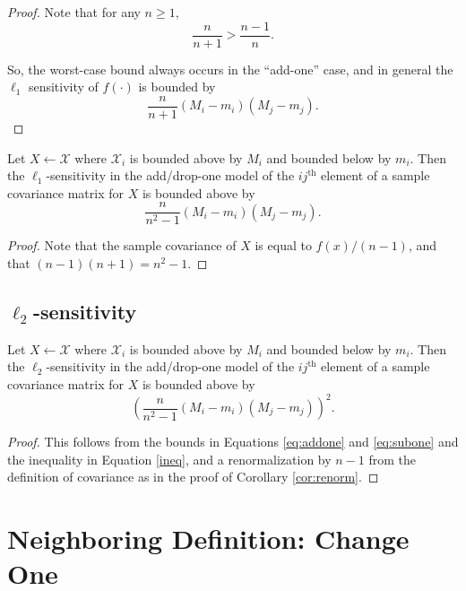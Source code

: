 \documentclass[11pt]{scrartcl} %
\begin{document}
\begin{proof}
Note that for any $n \ge 1$,
	\begin{equation}
	\label{ineq}
	 \frac{n}{n + 1} > \frac{n-1}{n}.
	\end{equation}

So, the worst-case bound always occurs in the ``add-one'' case, and in general the  $\ell_1$ sensitivity of $f(\cdot)$ is bounded by
 $$ \frac{n}{n+1}  (M_i - m_i)(M_j - m_j).$$ 
\end{proof}

\begin{corollary}
\label{cor:renorm}
Let $X \leftarrow \mathcal{X}$ where $\mathcal{X}_i$ is bounded above by $M_i$ and bounded below by $m_i$. Then the $\ell_1$-sensitivity in the add/drop-one model of the $ij^{\text{th}}$ element of a sample covariance matrix for $X$ is bounded above by 
$$ \frac{n}{n^2-1}(M_i - m_i)(M_j - m_j).$$
\end{corollary}

\begin{proof}
Note that the sample covariance of $X$ is equal to $f(x)/(n-1)$, and that $(n-1)(n+1) = n^2 -1$.
\end{proof}

\subsection{$\ell_2$-sensitivity}

\begin{theorem}
Let $X \leftarrow \mathcal{X}$ where $\mathcal{X}_i$ is bounded above by $M_i$ and bounded below by $m_i$. Then the $\ell_2$-sensitivity in the add/drop-one model of the $ij^{\text{th}}$ element of a sample covariance matrix for $X$ is bounded above by
$$\left(\frac{n}{n^2-1}(M_i - m_i)(M_j - m_j)\right)^2.$$
\end{theorem}

\begin{proof}
This follows from the bounds in Equations \ref{eq:addone} and \ref{eq:subone} and the inequality in Equation \ref{ineq}, and a renormalization by $n-1$ from the definition of covariance as in the proof of Corollary \ref{cor:renorm}.
\end{proof}

\section{Neighboring Definition: Change One}
\end{document}
